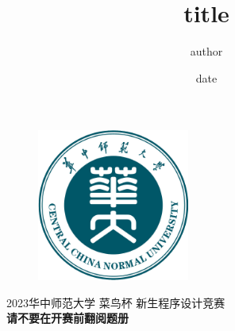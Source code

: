 \documentclass[12pt,a4paper]{ctexart}
\begin{document}
\title{title}
\author{author}
\date{date}

\begin{titlepage}
  \begin{figure}[H]
    \centering
    \begin{minipage}[t]{0.48\textwidth}
      \centering
      \includegraphics[height=5cm]{CCNU.jpg}
    \end{minipage}
  \end{figure}
  \begin{center}
    \textsc{\Large{2023华中师范大学 菜鸟杯 新生程序设计竞赛\\}}
    \vspace{5mm}
    \fontsize{10mm}{7mm}\selectfont
    \textbf{\Large{请不要在开赛前翻阅题册}}
    

  \end{center}

  \vspace{5mm}

  \begin{center}
    
  \end{center}

  \begin{figure}[b]
  \end{figure}

\end{titlepage}

\newpage\null\thispagestyle{blank}\newpage
\end{document}
